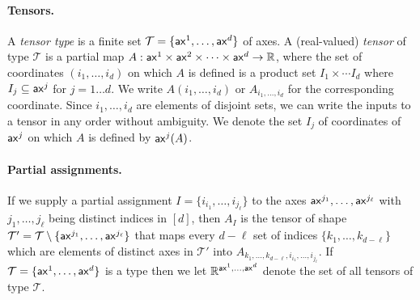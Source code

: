 \documentclass{article}
\begin{document}
\paragraph{Tensors.} A \emph{tensor type} is a finite set $\mathcal{T} = \{ \mathsf{ax}^1,\ldots, \mathsf{ax}^d \}$ of axes.
A  (real-valued) \emph{tensor} of type $\mathcal{T}$ is a partial map $A:\mathsf{ax}^1 \times \mathsf{ax}^2 \times \cdots \times \mathsf{ax}^d \rightarrow \mathbb{R}$,
where the set of coordinates $(i_1,\ldots,i_d)$ on which $A$ is defined is a product set $I_1 \times \cdots I_d$ where $I_j \subseteq \mathsf{ax}^j$ for $j=1 \ldots d$.
We write $A(i_1,\ldots,i_d)$ or $A_{i_1,\ldots,i_d}$ for the corresponding coordinate.
Since $i_1,\ldots,i_d$ are elements of disjoint sets, we can write the inputs to a tensor in any order without ambiguity.
We denote the set $I_j$ of coordinates of $\mathsf{ax}^j$ on which $A$ is defined by $\mathsf{ax}^j(A)$. 


\paragraph{Partial assignments.} If we supply a partial assignment $I = \{ i_{i_1},\ldots,i_{j_\ell} \}$ to the axes $\mathsf{ax}^{j_1},\ldots,\mathsf{ax}^{j_\ell}$ with $j_1,\ldots,j_\ell$ being distinct indices in  $[d]$, then $A_I$ is the tensor of shape $\mathcal{T}' = \mathcal{T} \setminus \{ \mathsf{ax}^{j_1},\ldots,\mathsf{ax}^{j_\ell} \}$ that maps every $d-\ell$ set of indices $\{ k_1,\ldots,k_{d-\ell} \}$ which are elements of distinct axes in $\mathcal{T}'$ into $A_{k_1,\ldots,k_{d-\ell}, i_{i_1},\ldots,i_{j_\ell}}$.
If $\mathcal{T} = \{ \mathsf{ax}^1,\ldots, \mathsf{ax}^d \}$ is a type then we let $\mathbb{R}^{\mathsf{ax}^1,\ldots, \mathsf{ax}^d }$ denote the set of all tensors of type $\mathcal{T}$.
\end{document}
